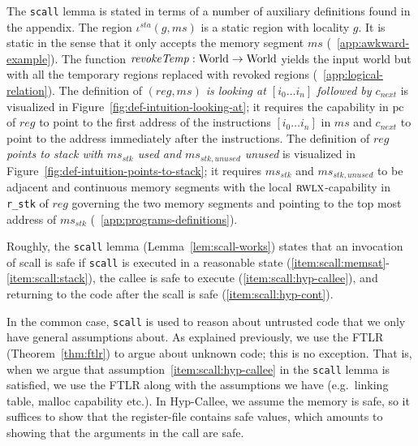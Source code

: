 \documentclass[format=acmsmall, review=true, screen=true]{acmart}
\renewcommand{\figurename}{Figure}
\newcommand{\fun}{\rightarrow}
\newcommand{\var}[1]{\mathit{#1}}
\newcommand{\hs}{\var{ms}}
\newcommand{\ms}{\hs}
\newcommand{\gl}{\var{g}}
\newcommand{\pcreg}{\mathrm{pc}}
\newcommand{\reg}{\var{reg}}
\newcommand{\stk}{\var{stk}}
\newcommand{\plainfun}[2]{
  \ifthenelse{\equal{#2}{}}
  {\mathit{#1}}
  {\mathit{#1}(#2)}
}
\newcommand{\revokeTemp}[1]{\plainfun{revokeTemp}{#1}}
\newcommand{\plaindom}[1]{\mathrm{#1}}
\newcommand{\Worlds}{\plaindom{World}}
\newcommand{\plainperm}[1]{\textsc{#1}}
\newcommand{\rwlx}{\plainperm{rwlx}}
\newenvironment{toplas}{}{}
\begin{document}
\begin{toplas}
\begin{lemma}[$\mathtt{scall}$ works]
\end{lemma}
\begin{toplas}
  The \texttt{scall} lemma is stated in terms of a number of auxiliary definitions found in the appendix.
  The region $\iota^{sta}(\gl,\ms)$ is a static region with locality $\gl$.
  It is static in the sense that it only accepts the memory segment $\ms$ (\appendixname~\ref{app:awkward-example}).
  The function $\revokeTemp{} : \Worlds \fun \Worlds$ yields the input world but with all the temporary regions replaced with revoked regions (\appendixname~\ref{app:logical-relation}).
  The definition of \textit{$(\reg,\ms)$ is looking at $[i_0\dots i_n]$ followed by $c_{\var{next}}$} is visualized in \figurename~\ref{fig:def-intuition-looking-at}; it requires the capability in $\pcreg$ of $\reg$ to point to the first address of the instructions $[i_0\dots i_n]$ in $\ms$ and $c_{\var{next}}$ to point to the address immediately after the instructions.
  The definition of \textit{$\reg$ points to stack with $\ms_\stk$ used and $\ms_{\stk,\var{unused}}$ unused} is visualized in \figurename~\ref{fig:def-intuition-points-to-stack}; it requires $\ms_\stk$ and $\ms_{\stk,\var{unused}}$ to be adjacent and continuous memory segments with the local $\rwlx$-capability in \texttt{r\_stk} of $\reg$ governing the two memory segments and pointing to the top most address of $\ms_\stk$ (\appendixname~\ref{app:programs-definitions}).
\end{toplas}

Roughly, the \texttt{scall} lemma (Lemma~\ref{lem:scall-works}) states that an invocation of scall is safe if \texttt{scall} is executed in a reasonable state (\ref{item:scall:memsat}-\ref{item:scall:stack}), the callee is safe to execute (\ref{item:scall:hyp-callee}), and returning to the code after the scall is safe (\ref{item:scall:hyp-cont}).

In the common case, \texttt{scall} is used to reason about untrusted code that we only have general assumptions about.
As explained previously, we use the FTLR (Theorem~\ref{thm:ftlr}) to argue about unknown code; this is no exception.
That is, when we argue that assumption~\ref{item:scall:hyp-callee} in the \texttt{scall} lemma is satisfied, we use the FTLR along with the assumptions we have (e.g.\ linking table, malloc capability etc.).
In Hyp-Callee, we assume the memory is safe, so it suffices to show that the register-file contains safe values, which amounts to showing that the arguments in the call are safe.


\end{toplas}
\end{document}
